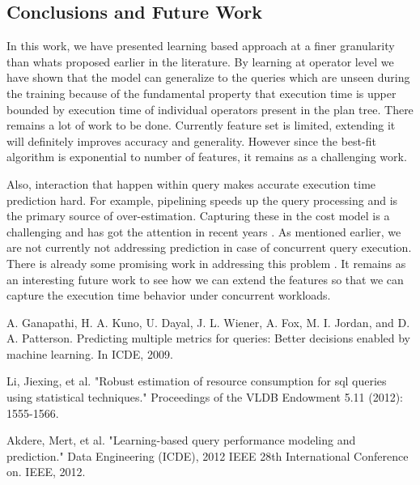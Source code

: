 \documentclass{article}
\begin{document}
\begin{multicols}{2}
	\section{Conclusions and Future Work}
	In this work, we have presented learning based approach at a finer granularity than whats proposed earlier in the literature. By learning at operator level we have shown that the model can generalize to the queries which are unseen during the training because of the fundamental property that execution time is upper bounded by execution time of individual operators present in the plan tree. 
	There remains a lot of work to be done. Currently feature set is limited, extending it will definitely improves accuracy and generality. However since the best-fit algorithm is exponential to number of features, it remains as a challenging work.
	
	
	Also, interaction that happen within query makes accurate execution time prediction hard. For example, pipelining speeds up the query processing and is the primary source of over-estimation. Capturing these in the cost model is a challenging and has got the attention in recent years \cite{concurrent}. As mentioned earlier, we are not currently not addressing prediction in case of concurrent query execution. There is already some promising work in addressing this problem \cite{Ahmed,qshuffler}. It remains as an interesting future work to see how we can extend the features so that we can capture the execution time behavior under concurrent workloads.
	
	\begin{thebibliography}{9}
	A. Ganapathi, H. A. Kuno, U. Dayal, J. L. Wiener, A. Fox, M. I. Jordan,
	and D. A. Patterson. Predicting multiple metrics for queries: Better
	decisions enabled by machine learning. In ICDE, 2009.
	
	Li, Jiexing, et al. "Robust estimation of resource consumption for sql queries using statistical 			techniques." Proceedings of the VLDB Endowment 5.11 (2012): 1555-1566.
	
	Akdere, Mert, et al. "Learning-based query performance modeling and prediction." Data Engineering 			(ICDE), 2012 IEEE 28th International Conference on. IEEE, 2012.	
	

\end{thebibliography}
\end{multicols}
\end{document}
